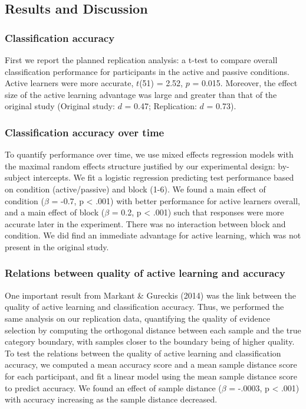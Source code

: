 \documentclass[10pt, letterpaper]{article}
\begin{document}
\subsection{Results and Discussion}\label{results-and-discussion}

\subsubsection{Classification accuracy}\label{classification-accuracy}

First we report the planned replication analysis: a t-test to compare
overall classification performance for participants in the active and
passive conditions. Active learners were more accurate, \(t\)(51) =
2.52, \(p\) = 0.015. Moreover, the effect size of the active learning
advantage was large and greater than that of the original study
(Original study: \(d\) = 0.47; Replication: \(d\) = 0.73).

\subsubsection{Classification accuracy over
time}\label{classification-accuracy-over-time}

To quantify performance over time, we use mixed effects regression
models with the maximal random effects structure justified by our
experimental design: by-subject intercepts. We fit a logistic regression
predicting test performance based on condition (active/passive) and
block (1-6). We found a main effect of condition (\(\beta\) = -0.7, p
\textless{} .001) with better performance for active learners overall,
and a main effect of block (\(\beta\) = 0.2, p \textless{} .001) such
that responses were more accurate later in the experiment. There was no
interaction between block and condition. We did find an immediate
advantage for active learning, which was not present in the original
study.

\subsubsection{Relations between quality of active learning and
accuracy}\label{relations-between-quality-of-active-learning-and-accuracy}

One important result from Markant \& Gureckis (2014) was the link
between the quality of active learning and classification accuracy.
Thus, we performed the same analysis on our replication data,
quantifying the quality of evidence selection by computing the
orthogonal distance between each sample and the true category boundary,
with samples closer to the boundary being of higher quality. To test the
relations between the quality of active learning and classification
accuracy, we computed a mean accuracy score and a mean sample distance
score for each participant, and fit a linear model using the mean sample
distance score to predict accuracy. We found an effect of sample
distance (\(\beta\) = -.0003, p \textless{} .001) with accuracy
increasing as the sample distance decreased.
\end{document}
